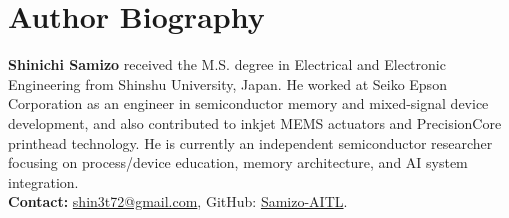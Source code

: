 \documentclass[conference]{IEEEtran}
\begin{document}
\section*{Author Biography}
\noindent\textbf{Shinichi Samizo}
received the M.S. degree in Electrical and Electronic Engineering from Shinshu University, Japan.
He worked at Seiko Epson Corporation as an engineer in semiconductor memory and mixed-signal device development, and also contributed to inkjet MEMS actuators and PrecisionCore printhead technology.
He is currently an independent semiconductor researcher focusing on process/device education, memory architecture, and AI system integration.\\
\textbf{Contact:} \href{mailto:shin3t72@gmail.com}{shin3t72@gmail.com}, GitHub: \href{https://github.com/Samizo-AITL}{Samizo-AITL}.
\end{document}
